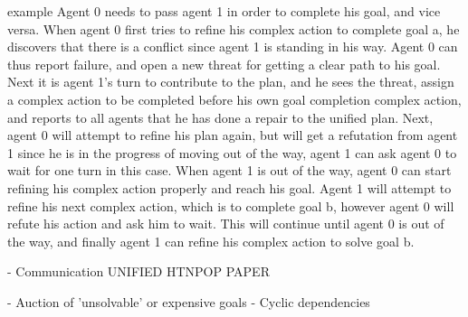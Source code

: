 \documentclass[Main]{subfiles}
\begin{document}
example
Agent 0 needs to pass agent 1 in order to complete his goal, and vice versa.
When agent 0 first tries to refine his complex action to complete goal a, he discovers that there is a conflict since agent 1 is standing in his way. Agent 0 can thus report failure, and open a new threat for getting a clear path to his goal. Next it is agent 1's turn to contribute to the plan, and he sees the threat, assign a complex action to be completed before his own goal completion complex action, and reports to all agents that he has done a repair to the unified plan. Next, agent 0 will attempt to refine his plan again, but will get a refutation from agent 1 since he is in the progress of moving out of the way, agent 1 can ask agent 0 to wait for one turn in this case. When agent 1 is out of the way, agent 0 can start refining his complex action properly and reach his goal. Agent 1 will attempt to refine his next complex action, which is to complete goal b, however agent 0 will refute his action and ask him to wait. This will continue until agent 0 is out of the way, and finally agent 1 can refine his complex action to solve goal b.


- Communication
UNIFIED HTNPOP PAPER

- Auction of 'unsolvable' or expensive goals \cite{VanderKrogt2005}
  - Cyclic dependencies 


\end{document}
